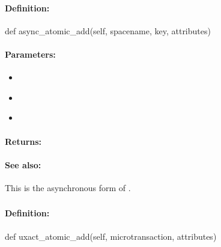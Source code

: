 \paragraph{Definition:}
\begin{pythoncode}
def async_atomic_add(self, spacename, key, attributes)
\end{pythoncode}

\paragraph{Parameters:}
\begin{itemize}[noitemsep]
\item {}\\

\item {}\\

\item {}\\

\end{itemize}

\paragraph{Returns:}


\paragraph{See also:}  This is the asynchronous form of .

\pagebreak
\subsubsection{}
\label{api:python:uxact_atomic_add}


\paragraph{Definition:}
\begin{pythoncode}
def uxact_atomic_add(self, microtransaction, attributes)
\end{pythoncode}

